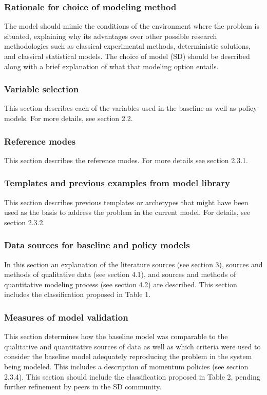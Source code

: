 \documentclass[11pt]{article}
\begin{document}
\subsubsection {Rationale for choice of modeling method}
The model should mimic the conditions of the environment where the problem is situated, explaining why its advantages over other possible research methodologies such as classical experimental methods, deterministic solutions, and classical statistical models. The choice of model (SD) should be described along with a brief explanation of what that modeling option entails.

\subsubsection {Variable selection}
This section describes each of the variables used in the baseline as well as policy models.  For more details, see section 2.2.

\subsubsection {Reference modes}
This section describes the reference modes.  For more details see section 2.3.1.

\subsubsection {Templates and previous examples from model library}
This section describes previous templates or archetypes that might have been used as the basis to address the problem in the current model.  For details, see section 2.3.2.

\subsubsection {Data sources for baseline and policy models}
In this section an explanation of the literature sources (see section 3), sources and methods of qualitative data (see section 4.1), and sources and methods of quantitative modeling process (see section 4.2) are described.  This section includes the classification proposed in Table 1.

\subsubsection {Measures of model validation}
This section determines how the baseline model was comparable to the qualitative and quantitative sources of data as well as which criteria were used to consider the baseline model adequately reproducing the problem in the system being modeled.  This includes a description of momentum policies (see section 2.3.4).  This section should include the classification proposed in Table 2, pending further refinement by peers in the SD community.
\end{document}
